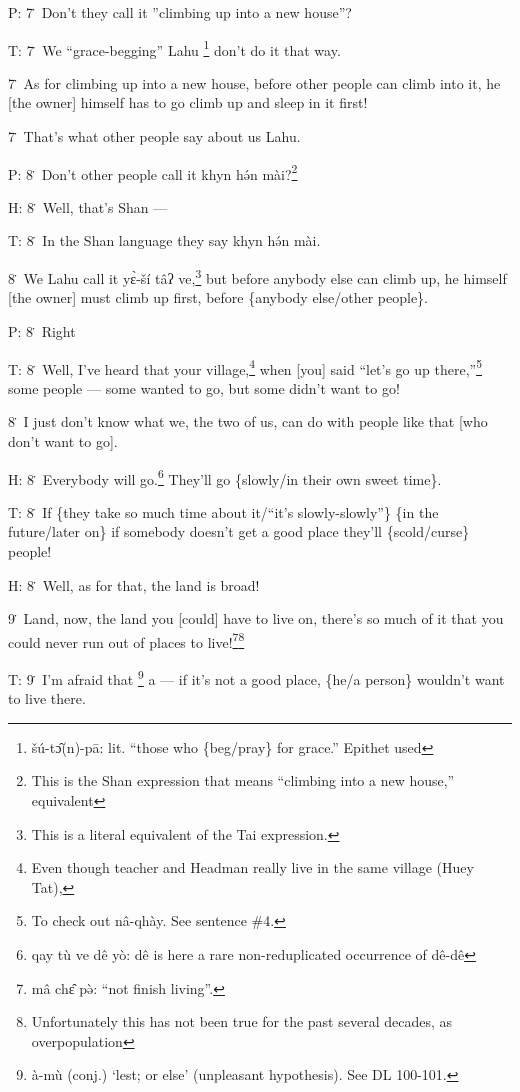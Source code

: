 P: 7\. Don't they call it ''climbing up into a new house''?

T: 7\. We ``grace-begging'' Lahu \footnote{šú-tɔ̂(n)-pā: lit. ``those who \{beg/pray\} for grace.'' Epithet used} don't do it that way.

7\. As for climbing up into a new house, before other people can climb into it,
he [the owner] himself has to go climb up and sleep in it first!

7\. That's what other people say about us Lahu.

P: 8\. Don't other people call it khyn hə́n mài?\footnote{This is the Shan expression that means ``climbing into a new house,'' equivalent}

H: 8\. Well, that's Shan ---

T: 8\. In the Shan language they say khyn hə́n mài.

8\. We Lahu call it yɛ̀-ší tâʔ ve,\footnote{This is a literal equivalent of the Tai expression.} but before anybody else can climb
up, he himself [the owner] must climb up first, before \{anybody else/other people\}.

P: 8\. Right

T: 8\. Well, I've heard that your village,\footnote{Even though teacher and Headman really live in the same village (Huey Tat),} when [you] said ``let's go up there,''\footnote{To check out nâ-qhày. See sentence \#4.}
some people --- some wanted to go, but some didn't want to go!

8\. I just don't know what we, the two of us, can do with people like that [who
don't want to go].

H: 8\. Everybody will go.\footnote{qay tù ve dê yò: dê is here a rare non-reduplicated occurrence of dê-dê} They'll go \{slowly/in their own sweet time\}.

T: 8\. If \{they take so much time about it/``it's slowly-slowly''\} \{in the future/later
on\} if somebody doesn't get a good place they'll \{scold/curse\} people!

H: 8\. Well, as for that, the land is broad!

9\. Land, now, the land you [could] have to live on, there's so much of it that
you could never run out of places to live!\footnote{mâ chɛ̂ pə̀: ``not finish living''.}\footnote{Unfortunately this has not been true for the past several decades, as overpopulation}

T: 9\. I'm afraid that \footnote{à-mù (conj.) `lest; or else' (unpleasant hypothesis). See DL 100-101.} a --- if it's not a good place, \{he/a person\} wouldn't
want to live there.

